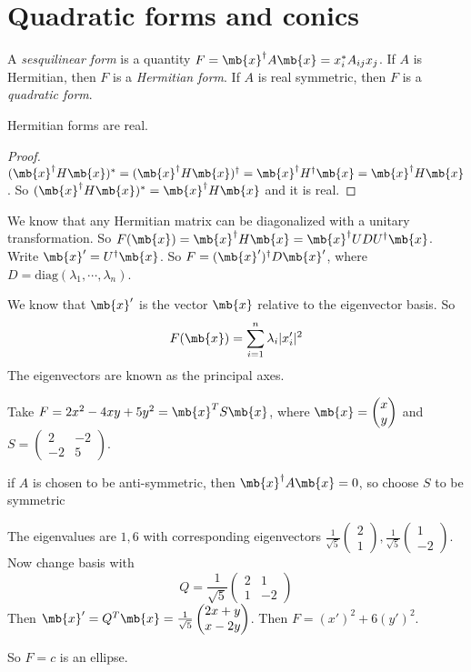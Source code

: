 \documentclass[a4paper]{article}
\begin{document}
\section{Quadratic forms and conics}
\begin{defi}
  A \emph{sesquilinear form} is a quantity $F = \mb{x}^\dagger A\mb{x} = x_i^*A_{ij}x_j$. If $A$ is Hermitian, then $F$ is a \emph{Hermitian form}. If $A$ is real symmetric, then $F$ is a \emph{quadratic form}.
\end{defi}

\begin{thm}
  Hermitian forms are real.
\end{thm}
\begin{proof}
  $(\mb{x}^\dagger H\mb{x})^* = (\mb{x}^\dagger H\mb{x})^\dagger = \mb{x}^\dagger H^\dagger\mb{x} = \mb{x}^\dagger H\mb{x}$. So $(\mb{x}^\dagger H\mb{x})^* = \mb{x}^\dagger H\mb{x}$ and it is real.
\end{proof}

We know that any Hermitian matrix can be diagonalized with a unitary transformation. So $F(\mb{x}) = \mb{x}^\dagger H\mb{x} = \mb{x}^\dagger UDU^\dagger \mb{x}$. Write $\mb{x}' = U^\dagger \mb{x}$. So $F = (\mb{x}')^\dagger D\mb{x}'$, where $D = \mathrm{diag}(\lambda_1,\cdots,\lambda_n)$.

We know that $\mb{x}'$ is the vector $\mb{x}$ relative to the eigenvector basis. So 
\[
F(\mb{x}) = \sum_{i = 1}^n \lambda_i |x_i'|^2
\]
The eigenvectors are known as the principal axes.

\begin{eg}
  Take $F = 2x^2 - 4xy + 5y^2 = \mb{x}^TS\mb{x}$, where $\mb{x} = 
  \begin{pmatrix}
    x\\y
  \end{pmatrix}$ and $S = 
  \begin{pmatrix}
    2 & -2\\
    -2 & 5
  \end{pmatrix}$.

  \note if $A$ is chosen to be anti-symmetric, then $\mb{x}^\dagger A\mb{x} = 0$, so choose $S$ to be symmetric

  The eigenvalues are $1, 6$ with corresponding eigenvectors $
  \displaystyle \frac{1}{\sqrt{5}}\begin{pmatrix}
    2\\1
  \end{pmatrix},\frac{1}{\sqrt{5}}
  \begin{pmatrix}
    1\\-2
  \end{pmatrix}$. Now change basis with
  \[
  Q = \frac{1}{\sqrt{5}}
  \begin{pmatrix}
    2 & 1\\
    1 & -2
  \end{pmatrix}
  \]
  Then $\mb{x}' = Q^T\mb{x} =
  \frac{1}{\sqrt{5}}\begin{pmatrix}
    2x + y\\x - 2y
  \end{pmatrix}$. Then $F = (x')^2 + 6(y')^2$.

  So $F = c$ is an ellipse.
\end{eg}
\end{document}
